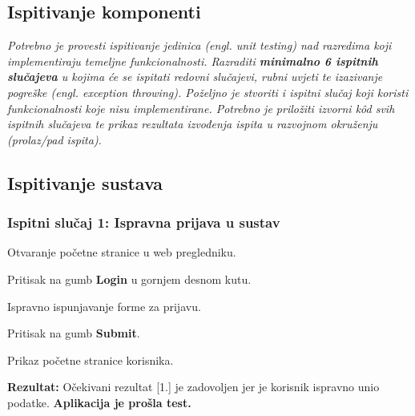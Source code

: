 			
			\subsection{Ispitivanje komponenti}
			\textit{Potrebno je provesti ispitivanje jedinica (engl. unit testing) nad razredima koji implementiraju temeljne funkcionalnosti. Razraditi \textbf{minimalno 6 ispitnih slučajeva} u kojima će se ispitati redovni slučajevi, rubni uvjeti te izazivanje pogreške (engl. exception throwing). Poželjno je stvoriti i ispitni slučaj koji koristi funkcionalnosti koje nisu implementirane. Potrebno je priložiti izvorni kôd svih ispitnih slučajeva te prikaz rezultata izvođenja ispita u razvojnom okruženju (prolaz/pad ispita). }
			
			
			
			\subsection{Ispitivanje sustava}
			
			\subsubsection{Ispitni slučaj 1: Ispravna prijava u sustav}
			
			
			\begin{packed_enum}
				
				\item  Otvaranje početne stranice u web pregledniku.
				\item  Pritisak na gumb \textbf{Login} u gornjem desnom kutu.
				\item  Ispravno ispunjavanje forme za prijavu.
				\item  Pritisak na gumb \textbf{Submit}. 
				
			\end{packed_enum}
			
			\begin{packed_enum}
				
				\item  Prikaz početne stranice korisnika. 
				
			\end{packed_enum}
			
			\noindent \textbf{Rezultat:} Očekivani rezultat [1.] je zadovoljen jer je korisnik ispravno unio podatke. \textbf{Aplikacija je prošla test.}
			
